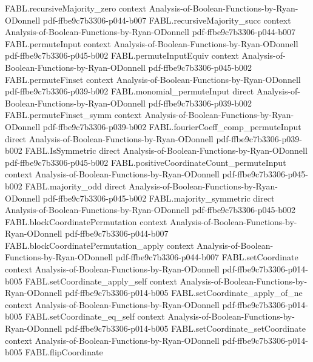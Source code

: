 \begin{theorem}
\proofstep
  {FABL.recursiveMajority_zero}
  {context}
  {Analysis-of-Boolean-Functions-by-Ryan-ODonnell}
  {pdf-ffbe9c7b3306-p044-b007}
\proofstep
  {FABL.recursiveMajority_succ}
  {context}
  {Analysis-of-Boolean-Functions-by-Ryan-ODonnell}
  {pdf-ffbe9c7b3306-p044-b007}
\proofstep
  {FABL.permuteInput}
  {context}
  {Analysis-of-Boolean-Functions-by-Ryan-ODonnell}
  {pdf-ffbe9c7b3306-p045-b002}
\proofstep
  {FABL.permuteInputEquiv}
  {context}
  {Analysis-of-Boolean-Functions-by-Ryan-ODonnell}
  {pdf-ffbe9c7b3306-p045-b002}
\proofstep
  {FABL.permuteFinset}
  {context}
  {Analysis-of-Boolean-Functions-by-Ryan-ODonnell}
  {pdf-ffbe9c7b3306-p039-b002}
\proofstep
  {FABL.monomial_permuteInput}
  {direct}
  {Analysis-of-Boolean-Functions-by-Ryan-ODonnell}
  {pdf-ffbe9c7b3306-p039-b002}
\proofstep
  {FABL.permuteFinset_symm}
  {context}
  {Analysis-of-Boolean-Functions-by-Ryan-ODonnell}
  {pdf-ffbe9c7b3306-p039-b002}
\proofstep
  {FABL.fourierCoeff_comp_permuteInput}
  {direct}
  {Analysis-of-Boolean-Functions-by-Ryan-ODonnell}
  {pdf-ffbe9c7b3306-p039-b002}
\proofstep
  {FABL.IsSymmetric}
  {direct}
  {Analysis-of-Boolean-Functions-by-Ryan-ODonnell}
  {pdf-ffbe9c7b3306-p045-b002}
\proofstep
  {FABL.positiveCoordinateCount_permuteInput}
  {context}
  {Analysis-of-Boolean-Functions-by-Ryan-ODonnell}
  {pdf-ffbe9c7b3306-p045-b002}
\proofstep
  {FABL.majority_odd}
  {direct}
  {Analysis-of-Boolean-Functions-by-Ryan-ODonnell}
  {pdf-ffbe9c7b3306-p045-b002}
\proofstep
  {FABL.majority_symmetric}
  {direct}
  {Analysis-of-Boolean-Functions-by-Ryan-ODonnell}
  {pdf-ffbe9c7b3306-p045-b002}
\proofstep
  {FABL.blockCoordinatePermutation}
  {context}
  {Analysis-of-Boolean-Functions-by-Ryan-ODonnell}
  {pdf-ffbe9c7b3306-p044-b007}
\proofstep
  {FABL.blockCoordinatePermutation_apply}
  {context}
  {Analysis-of-Boolean-Functions-by-Ryan-ODonnell}
  {pdf-ffbe9c7b3306-p044-b007}
\proofstep
  {FABL.setCoordinate}
  {context}
  {Analysis-of-Boolean-Functions-by-Ryan-ODonnell}
  {pdf-ffbe9c7b3306-p014-b005}
\proofstep
  {FABL.setCoordinate_apply_self}
  {context}
  {Analysis-of-Boolean-Functions-by-Ryan-ODonnell}
  {pdf-ffbe9c7b3306-p014-b005}
\proofstep
  {FABL.setCoordinate_apply_of_ne}
  {context}
  {Analysis-of-Boolean-Functions-by-Ryan-ODonnell}
  {pdf-ffbe9c7b3306-p014-b005}
\proofstep
  {FABL.setCoordinate_eq_self}
  {context}
  {Analysis-of-Boolean-Functions-by-Ryan-ODonnell}
  {pdf-ffbe9c7b3306-p014-b005}
\proofstep
  {FABL.setCoordinate_setCoordinate}
  {context}
  {Analysis-of-Boolean-Functions-by-Ryan-ODonnell}
  {pdf-ffbe9c7b3306-p014-b005}
\proofstep
  {FABL.flipCoordinate}

\end{theorem}
